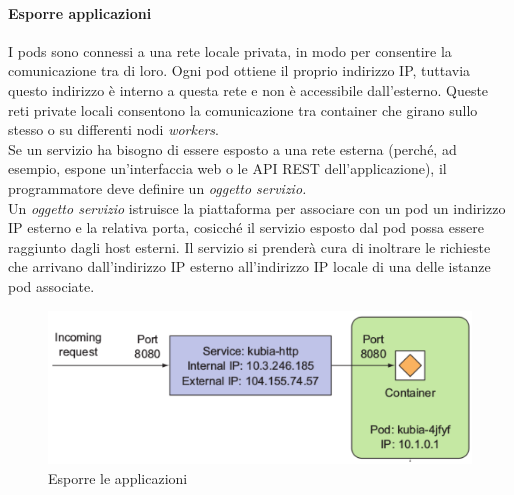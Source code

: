 \documentclass{article}
\begin{document}
\paragraph{Esporre applicazioni}
I pods sono connessi a una rete locale privata, in modo per consentire la comunicazione tra di loro. Ogni pod ottiene il proprio indirizzo IP, tuttavia questo indirizzo è interno a questa rete e non è accessibile dall'esterno. Queste reti private locali consentono la comunicazione tra container che girano sullo stesso o su differenti nodi \textit{workers}. \\
Se un servizio ha bisogno di essere esposto a una rete esterna (perché, ad esempio, espone un'interfaccia web o le API REST dell'applicazione), il programmatore deve definire un \textit{oggetto servizio.} \\
Un \textit{oggetto servizio} istruisce la piattaforma per associare con un pod un indirizzo IP esterno e la relativa porta, cosicché il servizio esposto dal pod possa essere raggiunto dagli host esterni. Il servizio si prenderà cura di inoltrare le richieste che arrivano dall'indirizzo IP esterno all'indirizzo IP locale di una delle istanze pod associate. 
\begin{figure}[H]
    \centering
    \includegraphics[scale=0.3]{img/kubernetes esporre applicazioni.png}
    \caption{Esporre le applicazioni}
\end{figure}\noindent
\end{document}
